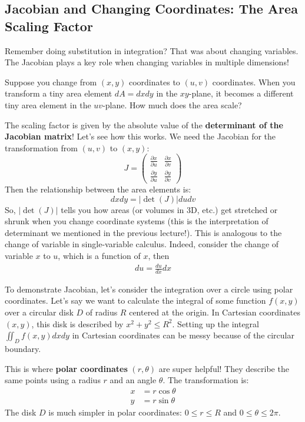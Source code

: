 \documentclass[11pt]{article}
\begin{document}
\subsection{Jacobian and Changing Coordinates: The Area Scaling Factor}

Remember doing substitution in integration? That was about changing variables. The Jacobian plays a key role when changing variables in multiple dimensions!

Suppose you change from $(x, y)$ coordinates to $(u, v)$ coordinates. When you transform a tiny area element $dA = dx dy$ in the $xy$-plane, it becomes a different tiny area element in the $uv$-plane. How much does the area scale?

The scaling factor is given by the absolute value of the \textbf{determinant of the Jacobian matrix}! Let's see how this works. We need the Jacobian for the transformation from $(u,v)$ to $(x,y)$:
$$ J = \begin{pmatrix} \frac{\partial x}{\partial u} & \frac{\partial x}{\partial v} \\ \frac{\partial y}{\partial u} & \frac{\partial y}{\partial v} \end{pmatrix} $$
Then the relationship between the area elements is:
$$ dx dy = \left| \det(J) \right| du dv $$
So, $|\det(J)|$ tells you how areas (or volumes in 3D, etc.) get stretched or shrunk when you change coordinate systems (this is the interpretation of determinant we mentioned in the previous lecture!). This is analogous to the change of variable in single-variable calculus. Indeed, consider the change of variable $x$ to $u$, which is a function of $x$, then
\begin{align*}
    du = \frac{du}{dx}dx
\end{align*}

To demonstrate Jacobian, let's consider the integration over a circle using polar coordinates. Let's say we want to calculate the integral of some function $f(x,y)$ over a circular disk $D$ of radius $R$ centered at the origin. In Cartesian coordinates $(x,y)$, this disk is described by $x^2 + y^2 \le R^2$. Setting up the integral $\iint_D f(x,y) dx dy$ in Cartesian coordinates can be messy because of the circular boundary.

This is where \textbf{polar coordinates} $(r, \theta)$ are super helpful! They describe the same points using a radius $r$ and an angle $\theta$. The transformation is:
\begin{align*} x &= r \cos \theta \\ y &= r \sin \theta \end{align*}
The disk $D$ is much simpler in polar coordinates: $0 \le r \le R$ and $0 \le \theta \le 2\pi$.
\end{document}
